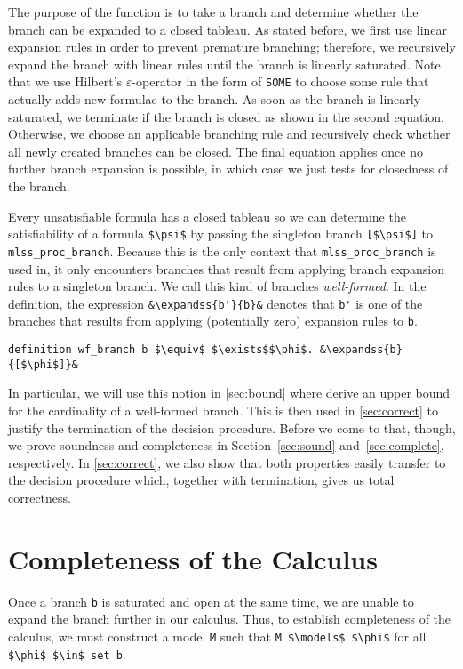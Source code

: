 \documentclass[sigplan,10pt,anonymous,review]{acmart}
\newcommand{\lefttriangle}{\mathrel{\tikz[baseline]{\draw (1ex, 0.75ex) -- (0, 1.25ex) -- (0, 0.25ex) -- cycle;}}}
\newcommand{\expandssSym}{\lefttriangle^*}
\newcommand{\expandss}[2]{#1 $\expandssSym$ #2}
\begin{document}
The purpose of the function is to take a branch and determine whether the branch can be expanded to a closed tableau.
As stated before, we first use linear expansion rules in order to prevent premature branching;
therefore, we recursively expand the branch with linear rules until the branch is linearly saturated.
Note that we use Hilbert's $\varepsilon$-operator in the form of \lstinline!SOME! to choose some rule that actually adds new formulae to the branch. 
As soon as the branch is linearly saturated, we terminate if the branch is closed as shown in the second equation.
Otherwise, we choose an applicable branching rule and recursively check whether all newly created branches can be closed.
The final equation applies once no further branch expansion is possible, in which case we just tests for closedness of the branch.

Every unsatisfiable formula has a closed tableau so we can determine the satisfiability of a formula \lstinline!$\psi$! by passing the singleton branch \lstinline![$\psi$]! to \lstinline!mlss_proc_branch!. 
Because this is the only context that \lstinline!mlss_proc_branch! is used in, it only encounters branches that result from applying branch expansion rules to a singleton branch.
We call this kind of branches \textit{well-formed}.
In the definition, the expression \lstinline!&\expandss{b'}{b}&! denotes that \lstinline!b'! is one of the branches that results from applying (potentially zero) expansion rules to \lstinline!b!.
\begin{lstlisting}
definition wf_branch b $\equiv$ $\exists$$\phi$. &\expandss{b}{[$\phi$]}&
\end{lstlisting}
In particular, we will use this notion in \autoref{sec:bound} where derive an upper bound for the cardinality of a well-formed branch.
This is then used in \autoref{sec:correct} to justify the termination of the decision procedure. 
Before we come to that, though, we prove soundness and completeness in Section~\ref{sec:sound} and~\ref{sec:complete}, respectively.
In \autoref{sec:correct}, we also show that both properties easily transfer to the decision procedure which, together with termination, gives us total correctness.

\section{Completeness of the Calculus\label{sec:complete}}
Once a branch \lstinline!b! is saturated and open at the same time, we are unable to expand the branch further in our calculus.
Thus, to establish completeness of the calculus, we must construct a model \lstinline!M! such that \lstinline!M $\models$ $\phi$! for all \lstinline!$\phi$ $\in$ set b!.
\end{document}
